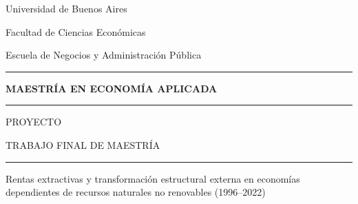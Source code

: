 \documentclass[12pt,a4paper]{report}
\newcommand{\ShelfRule}{%
	\vspace{-0.15cm}
	\par\noindent
	\textcolor{lineblue}{\rule{\linewidth}{0.6pt}}%
}
\begin{document}
	\begin{titlepage}

		\begin{center}
			{\cambriafont\fontsize{26}{31}\selectfont Universidad de Buenos Aires}

			\vspace{0.25cm}

			{\cambriafont\fontsize{26}{31}\selectfont Facultad de Ciencias Económicas}

			\vspace{0.25cm}

			{\cambriafont\fontsize{20}{24}\selectfont Escuela de Negocios y Administración Pública}
		\end{center}

		\ShelfRule
		\vspace{1.2cm}

		\begin{center}
			{\cambriafont\fontsize{22}{26}\selectfont\textbf{MAESTRÍA EN ECONOMÍA APLICADA}}
		\end{center}

		\ShelfRule
		\vspace{1.5cm}

		\begin{center}
			{\cambriafont\fontsize{22}{26}\selectfont PROYECTO}

			\vspace{0.25cm}

			{\cambriafont\fontsize{22}{26}\selectfont TRABAJO FINAL DE MAESTRÍA}
		\end{center}

		\ShelfRule
		\vspace{1.5cm}

		\begin{center}
			\begin{minipage}{0.9\textwidth}
				\noindent\justifying
				{\cambriafont\fontsize{18}{22}\selectfont
					Rentas extractivas y transformación estructural externa en economías dependientes de recursos naturales no renovables (1996–2022)}
			\end{minipage}
		\end{center}


\end{titlepage}
\end{document}
